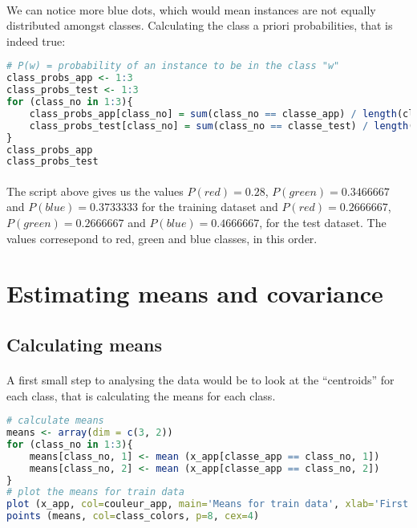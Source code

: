 \paragraph{}
We can notice more blue dots, which would mean instances are not equally distributed amongst classes.
Calculating the class a priori probabilities, that is indeed true:
\begin{lstlisting}[language=R, caption=A priori class probabilities]
# P(w) = probability of an instance to be in the class "w"
class_probs_app <- 1:3
class_probs_test <- 1:3
for (class_no in 1:3){
    class_probs_app[class_no] = sum(class_no == classe_app) / length(classe_app)
    class_probs_test[class_no] = sum(class_no == classe_test) / length(classe_test)
}
class_probs_app
class_probs_test
\end{lstlisting}

\paragraph{}
The script above gives us the values $P(red) = 0.28$, $P(green) = 0.3466667$ and $P(blue) = 0.3733333$ for the training dataset and $P(red) = 0.2666667$, $P(green) = 0.2666667$ and $P(blue) = 0.4666667$, for the test dataset.
The values corresepond to red, green and blue classes, in this order.


\section{Estimating means and covariance}

\subsection{Calculating means}

\paragraph{}
A first small step to analysing the data would be to look at the ``centroids'' for each class, that is calculating the means for each class.

\begin{lstlisting}[language=R, caption=Calculating means]
# calculate means
means <- array(dim = c(3, 2))
for (class_no in 1:3){
    means[class_no, 1] <- mean (x_app[classe_app == class_no, 1])
    means[class_no, 2] <- mean (x_app[classe_app == class_no, 2])
}
# plot the means for train data
plot (x_app, col=couleur_app, main='Means for train data', xlab='First feature', ylab='Second feature')
points (means, col=class_colors, p=8, cex=4)
\end{lstlisting}

